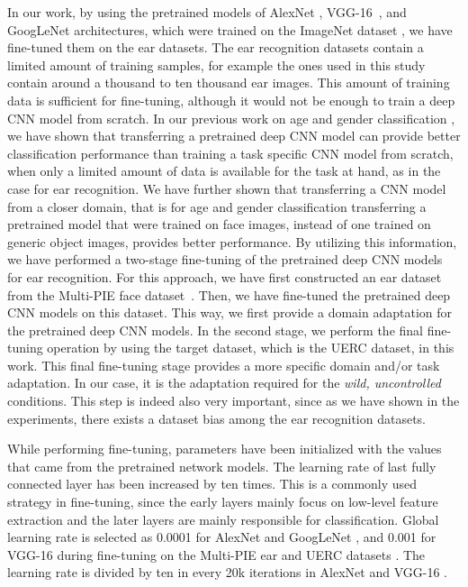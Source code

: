 \documentclass[11pt,journal,compsoc]{IEEEtran}
\begin{document}
In our work, by using the pretrained models of AlexNet \cite{Krizhevsky_2012}, VGG-16~\cite{Simonyan_2014}, and GoogLeNet \cite{Szegedy_2015} architectures, which were trained on the ImageNet dataset \cite{Deng_2009}, we have fine-tuned them on the ear datasets. The ear recognition datasets contain a limited amount of training samples, for example the ones used in this study contain around a thousand to ten thousand ear images. This amount of training data is sufficient for fine-tuning, although it would not be enough to train a deep CNN model from scratch. In our previous work on age and gender classification \cite{Ozbulak_2016}, we have shown that transferring a pretrained deep CNN model can provide better classification performance than training a task specific CNN model from scratch, when only a limited amount of data is available for the task at hand, as in the case for ear recognition. We have further shown that transferring a CNN model from a closer domain, that is for age and gender classification transferring a pretrained model that were trained on face images, instead of one trained on generic object images, provides better performance. By utilizing this information, we have performed a two-stage fine-tuning of the pretrained deep CNN models for ear recognition. For this approach, we have first constructed an ear dataset from the Multi-PIE face dataset~\cite{Gross_2008_a,Gross_2008_b}. Then, we have fine-tuned the pretrained deep CNN models on this dataset. This way, we first provide a domain adaptation for the pretrained deep CNN models. In the second stage, we perform the final fine-tuning operation by using the target dataset, which is the UERC \cite{Emersic_2017_b} dataset, in this work. This final fine-tuning stage provides a more specific domain and/or task adaptation. In our case, it is the adaptation required for the \textit{wild, uncontrolled} conditions. This step is indeed also very important, since as we have shown in the experiments, there exists a dataset bias \cite{Torralba_2011} among the ear recognition datasets. 

While performing fine-tuning, parameters have been initialized with the values that came from the pretrained network models. The learning rate of last fully connected layer has been increased by ten times. This is a commonly used strategy in fine-tuning, since the early layers mainly focus on low-level feature extraction and the later layers are mainly responsible for classification. 
Global learning rate is selected as 0.0001 for AlexNet \cite{Krizhevsky_2012} and GoogLeNet \cite{Szegedy_2015}, and 0.001 for VGG-16 \cite{Simonyan_2014} during fine-tuning on the Multi-PIE ear and UERC datasets \cite{Emersic_2017_b}. The learning rate is divided by ten in every 20k iterations in AlexNet \cite{Krizhevsky_2012} and VGG-16 \cite{Simonyan_2014}.
\end{document}
